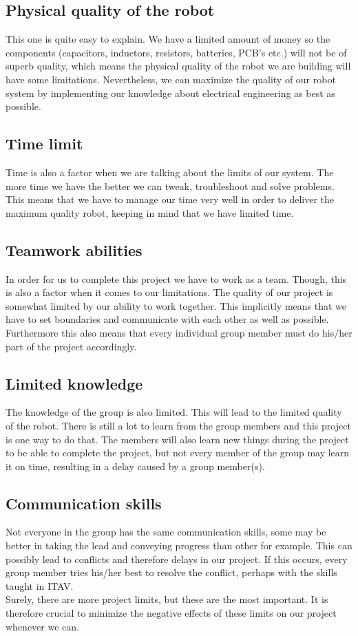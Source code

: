 \subsection{Physical quality of the robot}
This one is quite easy to explain. We have a limited amount of money so the components (capacitors, inductors, resistors, batteries, PCB's etc.) will not be of superb quality, which means the physical quality of the robot we are building will have some limitations. Nevertheless, we can maximize the quality of our robot system by implementing our knowledge about electrical engineering as best as possible.

\subsection{Time limit}
Time is also a factor when we are talking about the limits of our system. The more time we have the better we can tweak, troubleshoot and solve problems. This means that we have to manage our time very well in order to deliver the maximum quality robot, keeping in mind that we have limited time.


\subsection{Teamwork abilities}
In order for us to complete this project we have to work as a team. Though, this is also a factor when it comes to our limitations. The quality of our project is somewhat limited by our ability to work together. This implicitly means that we have to set boundaries and communicate with each other as well as possible. Furthermore this also means that every individual group member must do his/her part of the project accordingly.

\subsection{Limited knowledge}
The knowledge of the group is also limited. This will lead to the limited quality of the robot. There is still a lot to learn from the group members and this project is one way to do that. The members will also learn new things during the project to be able to complete the project, but not every member of the group may learn it on time, resulting in a delay caused by a group member(s).

\subsection{Communication skills}
Not everyone in the group has the same communication skills, some may be better in taking the lead and conveying progress than other for example. This can possibly lead to conflicts and therefore delays in our project. If this occurs, every group member tries his/her best to resolve the conflict, perhaps with the skills taught in ITAV.\\

Surely, there are more project limits, but these are the most important. It is therefore crucial to minimize the negative effects of these limits on our project whenever we can.